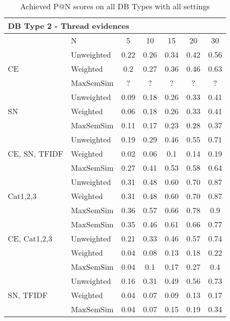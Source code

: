 \documentclass[conference]{IEEEtran}
\begin{document}
\begin{table*}[!h]
	\centering
	\renewcommand{\arraystretch}{1.3}
	\caption{Achieved P@N scores on all DB Types with all settings}
	\label{tab:resultsmrr2}
	\begin{tabular}{l||l|ccccc}\hline		
		
		\multicolumn{7}{l}{DB Type 2 - Thread evidences}\\\hline\hline
		& N & 5 & 10 & 15 & 20 & 30\\\hline
		\hline
		
		\multirow{3}{*}{CE} & Unweighted & 0.22 & 0.26 & 0.34 & 0.42 & 0.56\\
		 & Weighted & 0.2 & 0.27 & 0.36 & 0.46 & 0.63\\
		 & MaxSemSim & ? & ? & ? & ? & ?\\ 
		\hline
		
		\multirow{3}{*}{SN} & Unweighted & 0.09 & 0.18 & 0.26 & 0.33 & 0.41\\
		 & Weighted & 0.06 & 0.18 & 0.26 & 0.33 & 0.41\\
		 & MaxSemSim & 0.11 & 0.17 & 0.23 & 0.28 & 0.37\\ 
		\hline
		
		\multirow{3}{*}{CE, SN, TFIDF} & Unweighted & 0.19 & 0.29 & 0.46 & 0.55 & 0.71\\
		 & Weighted & 0.02 & 0.06 & 0.1 & 0.14 & 0.19\\
		 & MaxSemSim & 0.27 & 0.41 & 0.53 & 0.58 & 0.64\\ 
		\hline
		
		\multirow{3}{*}{Cat1,2,3} & Unweighted & 0.31 & 0.48 & 0.60 & 0.70 & 0.87\\
		 & Weighted & 0.31 & 0.48 & 0.60 & 0.70 & 0.87\\
		 & MaxSemSim & 0.36 & 0.57 & 0.66 & 0.78 & 0.9\\ 
		\hline

		\multirow{3}{*}{CE, Cat1,2,3} 
		 & MaxSemSim & 0.35 & 0.46 & 0.61 & 0.66 & 0.77\\ 
		\hline
		
		\multirow{3}{*}{TFIDF} & Unweighted & 0.21 & 0.33 & 0.46 & 0.57 & 0.74\\
		 & Weighted & 0.04 & 0.08 & 0.13 & 0.18 & 0.22\\
		 & MaxSemSim & 0.04 & 0.1 & 0.17 & 0.27 & 0.4\\ 
		\hline
		
		\multirow{3}{*}{SN, TFIDF} & Unweighted & 0.16 & 0.31 & 0.49 & 0.56 & 0.73\\
		 & Weighted & 0.04 & 0.07 & 0.09 & 0.13 & 0.17\\
		 & MaxSemSim & 0.04 & 0.07 & 0.15 & 0.19 & 0.34\\ 
		\hline		
		

\end{tabular}
\end{table*}
\end{document}

